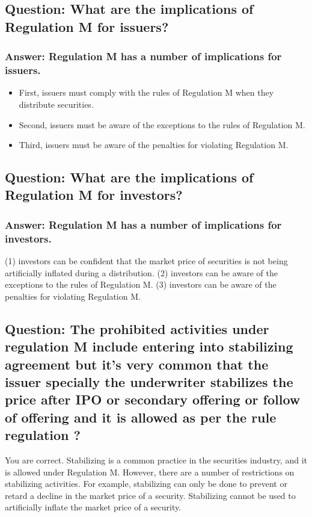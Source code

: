 \documentclass[11pt]{article}
\begin{document}
\subsection{Question: What are the implications of Regulation M for issuers?}
\label{sec:orgd4f7964}

\subsubsection{Answer: Regulation M has a number of implications for issuers.}
\label{sec:orgcde116a}
\begin{itemize}
\item First, issuers must comply with the rules of Regulation M when they distribute securities.
\item Second, issuers must be aware of the exceptions to the rules of Regulation M.
\item Third, issuers must be aware of the penalties for violating Regulation M.
\end{itemize}

\subsection{Question: What are the implications of Regulation M for investors?}
\label{sec:orgc94784f}

\subsubsection{Answer: Regulation M has a number of implications for investors.}
\label{sec:org9a6fd40}
(1) investors can be confident that the market price of securities is not being artificially inflated during a distribution.
(2) investors can be aware of the exceptions to the rules of Regulation M.
(3) investors can be aware of the penalties for violating Regulation M.

\subsection{Question: The prohibited activities under regulation M include entering into stabilizing agreement but it's very common that the issuer specially the underwriter stabilizes the price after IPO or secondary offering or follow of offering and it is allowed as per the rule regulation ?}
\label{sec:org3321543}

You are correct. Stabilizing is a common practice in the securities industry, and it is allowed under Regulation M.
However, there are a number of restrictions on stabilizing activities.
For example, stabilizing can only be done to prevent or retard a decline in the market price of a security.
Stabilizing cannot be used to artificially inflate the market price of a security.
\end{document}
